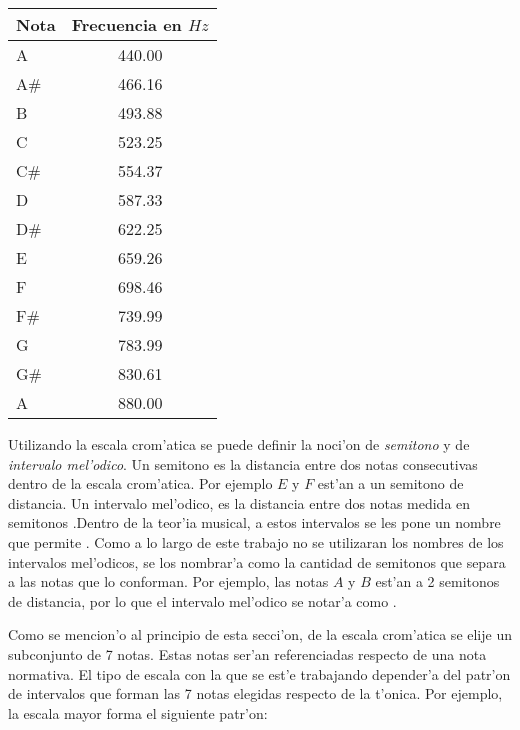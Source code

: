 \begin{table}[h]
\begin{center}
\begin{tabular}[c]{|l|c|}
\hline
\textbf{Nota} & \textbf{Frecuencia en $Hz$} \\
\hline 
A		&	440.00 \\
A\#		&	466.16 \\
B		&	493.88 \\
C		&	523.25 \\
C\#		&	554.37 \\
D		&	587.33 \\
D\#		&	622.25 \\
E		&	659.26 \\
F		&	698.46 \\
F\#		&	739.99 \\
G		&	783.99 \\
G\#		&	830.61 \\
A		&	880.00 \\ 
\hline
\end{tabular}
\label{tab:cromatica} 
\end{center}
\end{table}


Utilizando la escala crom'atica se puede definir la noci'on de \emph{semitono} y de \emph{intervalo mel'odico}. Un semitono es la distancia
entre dos notas consecutivas dentro de la escala crom'atica. Por ejemplo $E$ y $F$ est'an a un semitono de distancia. Un intervalo mel'odico, 
es la distancia entre dos notas medida en semitonos .Dentro de la teor'ia musical, a estos intervalos se les pone un nombre que permite . 
Como a lo largo de este trabajo no se utilizaran los nombres de los intervalos mel'odicos, se los nombrar'a como la cantidad de semitonos que separa
a las notas que lo conforman. Por ejemplo, las notas $A$ y $B$ est'an a 2 semitonos de distancia, por lo que el intervalo mel'odico
se notar'a como . 

Como se mencion'o al principio de esta secci'on, de la escala crom'atica se elije un subconjunto de 7 notas. Estas notas ser'an referenciadas
respecto de una nota normativa. El tipo de escala con la que se est'e trabajando depender'a del patr'on de intervalos que forman las 7 notas elegidas
respecto de la t'onica. Por ejemplo, la escala mayor forma el siguiente patr'on:

\begin{center}
      
\end{center}

